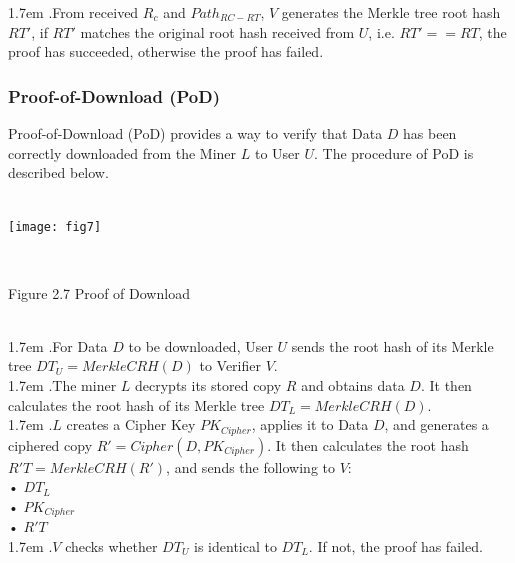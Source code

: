 \documentclass[10pt,a4paper]{article}
\begin{document}
\hangindent 1.7em
.\quad From received $R_{c}$ and $Path_{RC-RT}$, $V$ generates the Merkle tree root hash $RT'$, if $RT'$ matches the original root hash received from $U$, i.e. $RT' == RT$, the proof has succeeded, otherwise the proof has failed.  
\vspace{-0.5em}
\subsubsection{Proof-of-Download (PoD)}  %
Proof-of-Download (PoD) provides a way to verify that Data $D$ has been correctly downloaded from the Miner $L$ to User $U$. The procedure of PoD is described below.
\vspace{-0.5em}
\\ \\
\centerline{\texttt{[image: fig7]}}
 \\ \centerline{{Figure 2.7 Proof of Download}}
 \vspace{-1.5em}
\\

\hangindent 1.7em
.\quad For Data $D$ to be downloaded, User $U$ sends the root hash of its Merkle tree $DT_{U}=MerkleCRH(D)$ to Verifier $V$.
\vspace{-0.8em}
\\

\hangindent 1.7em
.\quad The miner $L$ decrypts its stored copy $R$ and obtains data $D$. It then calculates the root hash of its Merkle tree $DT_{L}=MerkleCRH(D)$.
\vspace{-0.8em}
\\

\hangindent 1.7em
.\quad $L$ creates a Cipher Key $PK_{Cipher}$, applies it to Data $D$, and generates a ciphered copy $R'=Cipher(D, PK_{Cipher})$. It then calculates the root hash $R'T=MerkleCRH(R')$, and sends the following to $V$:
\\•  $DT_{L}$ \\ 
   •  $PK_{Cipher}$ \\ 
   •  $R'T$ 
   \vspace{-0.5em}
\\

\hangindent 1.7em
.\quad $V$ checks whether $DT_{U}$ is identical to $DT_{L}$. If not, the proof has failed.
\vspace{-0.8em}
\\
\end{document}
